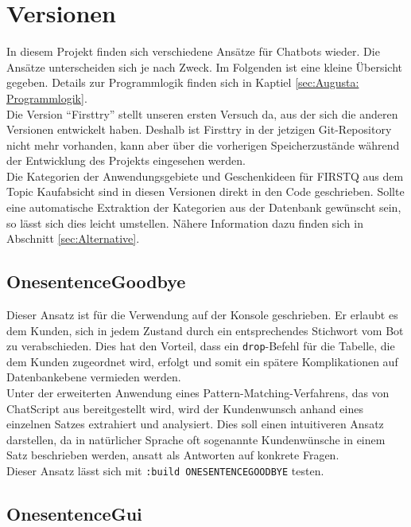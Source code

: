 \section{Versionen}
\label{sec:Versionen}

In diesem Projekt finden sich verschiedene Ansätze für Chatbots wieder. Die Ansätze unterscheiden sich je nach Zweck. Im Folgenden ist eine kleine Übersicht gegeben. Details zur Programmlogik finden sich in Kaptiel \ref{sec:Augusta: Programmlogik}.\\
Die Version "`Firsttry"' stellt unseren ersten Versuch da, aus der sich die anderen Versionen entwickelt haben. Deshalb ist Firsttry in der jetzigen Git-Repository nicht mehr vorhanden, kann aber über die vorherigen Speicherzustände während der Entwicklung des Projekts eingesehen werden.\\
Die Kategorien der Anwendungsgebiete und Geschenkideen für FIRSTQ aus dem Topic Kaufabsicht sind in diesen Versionen direkt in den Code geschrieben. Sollte eine automatische Extraktion der Kategorien aus der Datenbank gewünscht sein, so lässt sich dies leicht umstellen. Nähere Information dazu finden sich in Abschnitt \ref{sec:Alternative}.\\


\subsection{OnesentenceGoodbye}
\label{sec:OnesentenceGoodbye}

Dieser Ansatz ist für die Verwendung auf der Konsole geschrieben. Er erlaubt es dem Kunden, sich in jedem Zustand durch ein entsprechendes Stichwort vom Bot zu verabschieden. Dies hat den Vorteil, dass ein \lstinline|drop|-Befehl für die Tabelle, die dem Kunden zugeordnet wird, erfolgt und somit ein spätere Komplikationen auf Datenbankebene vermieden werden.\\
Unter der erweiterten Anwendung eines Pattern-Matching-Verfahrens, das von ChatScript aus bereitgestellt wird, wird der Kundenwunsch anhand eines einzelnen Satzes extrahiert und analysiert. Dies soll einen intuitiveren Ansatz darstellen, da in natürlicher Sprache oft sogenannte Kundenwünsche in einem Satz beschrieben werden, ansatt als Antworten auf konkrete Fragen.\\
Dieser Ansatz lässt sich mit \lstinline|:build ONESENTENCEGOODBYE| testen.\\

\subsection{OnesentenceGui}
\label{sec:OnesentenceGui}

